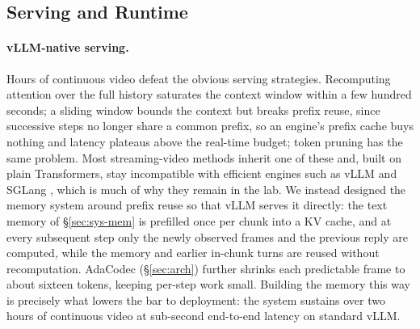 \documentclass{llmxive}
\providecommand{\todo}[1]{}
\begin{document}


\subsection{Serving and Runtime}\label{sec:sys-serve}
\paragraph{\textbf{vLLM-native serving.}}
Hours of continuous video defeat the obvious serving strategies. Recomputing attention over the full history saturates the context window within a few hundred seconds; a sliding window bounds the context but breaks prefix reuse, since successive steps no longer share a common prefix, so an engine's prefix cache buys nothing and latency plateaus above the real-time budget; token pruning has the same problem. Most streaming-video methods inherit one of these and, built on plain Transformers, stay incompatible with efficient engines such as vLLM \cite{kwon2023efficientmemorymanagementlarge} and SGLang \cite{zheng2024sglangefficientexecutionstructured}, which is much of why they remain in the lab. We instead designed the memory system around prefix reuse so that vLLM serves it directly: the text memory of §\ref{sec:sys-mem} is prefilled once per chunk into a KV cache, and at every subsequent step only the newly observed frames and the previous reply are computed, while the memory and earlier in-chunk turns are reused without recomputation. AdaCodec (§\ref{sec:arch}) further shrinks each predictable frame to about sixteen tokens, keeping per-step work small. Building the memory this way is precisely what lowers the bar to deployment: the system sustains over two hours of continuous video at sub-second end-to-end latency on standard vLLM. 
\end{document}
